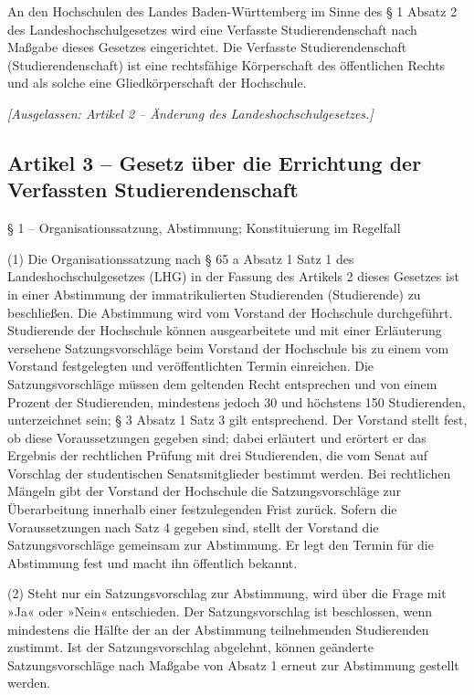 \documentclass[
10pt,
a4paper,
twoside,								%
titlepage=false,							%
draft=false								%
]{scrartcl}
\begin{document}
An den Hochschulen des Landes Baden-Württemberg im Sinne des § 1 Absatz 2 des Landeshochschulgesetzes wird eine Verfasste Studierendenschaft 
nach Maßgabe dieses Gesetzes eingerichtet. Die Verfasste Studierendenschaft (Studierendenschaft) ist eine rechtsfähige Körperschaft des öffentlichen Rechts und als solche eine Gliedkörperschaft der Hochschule.

\bigskip
\emph{[Ausgelassen: Artikel 2 – Änderung des Landeshochschulgesetzes.]}


\subsection{Artikel 3 – Gesetz über die Errichtung der Verfassten Studierendenschaft}

§ 1 – Organisationssatzung, Abstimmung; Konstituierung im Regelfall

(1) Die Organisationssatzung nach § 65 a Absatz 1 Satz 1 des Landeshochschulgesetzes (LHG) in der Fassung des Artikels 2 dieses Gesetzes ist in einer Abstimmung der immatrikulierten Studierenden (Studierende) zu beschließen. Die Abstimmung wird vom Vorstand der Hochschule durchgeführt. Studierende der Hochschule können ausgearbeitete und mit einer Erläuterung versehene Satzungsvorschläge beim Vorstand der Hochschule bis zu einem vom Vorstand festgelegten und veröffentlichten Termin einreichen. Die Satzungsvorschläge müssen dem geltenden Recht entsprechen und von einem Prozent der Studierenden, mindestens jedoch 30 und höchstens 150 Studierenden, unterzeichnet sein; § 3 Absatz 1 Satz 3 gilt entsprechend. Der Vorstand stellt fest, ob diese Voraussetzungen gegeben sind; dabei erläutert und erörtert er das Ergebnis der rechtlichen Prüfung mit drei Studierenden, die vom Senat auf Vorschlag der studentischen Senatsmitglieder bestimmt werden. Bei rechtlichen Mängeln gibt der Vorstand der Hochschule die Satzungsvorschläge zur Überarbeitung innerhalb einer festzulegenden Frist zurück. Sofern die Voraussetzungen nach Satz 4 gegeben sind, stellt der Vorstand die Satzungsvorschläge gemeinsam zur Abstimmung. Er legt den Termin für die Abstimmung fest und macht ihn öffentlich bekannt.

(2) Steht nur ein Satzungsvorschlag zur Abstimmung, wird über die Frage mit »Ja« oder »Nein« entschieden. Der Satzungsvorschlag ist beschlossen, wenn mindestens die Hälfte der an der Abstimmung teilnehmenden Studierenden zustimmt. Ist der Satzungsvorschlag abgelehnt, können geänderte Satzungsvorschläge nach Maßgabe von Absatz 1 erneut zur Abstimmung gestellt werden.
\end{document}
